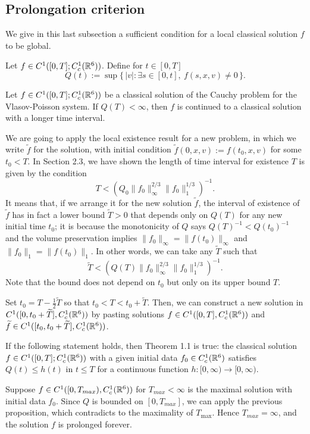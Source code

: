 \documentclass[12pt]{article}
\begin{document}
\subsection{Prolongation criterion}
We give in this last subsection a sufficient condition for a local classical solution $f$ to be global.
\begin{defn}
Let $f\in C^1([0,T];C_c^1(\mathbb{R}^6))$.
Define for $t\in[0,T]$
\[Q(t):=\sup\{\,|v|:\exists s\in[0,t],\ f(s,x,v)\ne0\,\}.\]
\end{defn}
\begin{prop}
Let $f\in C^1([0,T];C_c^1(\mathbb{R}^6))$ be a classical solution of the Cauchy problem for the Vlasov-Poisson system.
If $Q(T)<\infty$, then $f$ is continued to a classical solution with a longer time interval.
\end{prop}
\begin{pf}
We are going to apply the local existence result for a new problem, in which we write $\tilde f$ for the solution, with initial condition $\tilde f(0,x,v):=f(t_0,x,v)$ for some $t_0<T$.
In Section 2.3, we have shown the length of time interval for existence $T$ is given by the condition
\[T<(Q_0\|f_0\|_\infty^{2/3}\|f_0\|_1^{1/3})^{-1}.\]
It means that, if we arrange it for the new solution $\tilde f$, the interval of existence of $\tilde f$ has in fact a lower bound $\tilde T>0$ that depends only on $Q(T)$ for any new initial time $t_0$; it is because the monotonicity of $Q$ says $Q(T)^{-1}<Q(t_0)^{-1}$ and the volume preservation implies $\|f_0\|_\infty=\|f(t_0)\|_\infty$ and $\|f_0\|_1=\|f(t_0)\|_1$.
In other words, we can take any $\tilde T$ such that
\[\tilde T<(Q(T)\|f_0\|_\infty^{2/3}\|f_0\|_1^{1/3})^{-1}.\]
Note that the bound does not depend on $t_0$ but only on its upper bound $T$.

Set $t_0=T-\frac12\tilde T$ so that $t_0<T<t_0+\tilde T$.
Then, we can construct a new solution in $C^1([0,t_0+\widetilde T],C_c^1(\mathbb{R}^6))$ by pasting solutions $f\in C^1([0,T],C_c^1(\mathbb{R}^6))$ and $\widetilde f\in C^1([t_0,t_0+\widetilde T],C_c^1(\mathbb{R}^6))$.
\end{pf}

\begin{cor}
If the following statement holds, then Theorem 1.1 is true: the classical solution $f\in C^1([0,T];C_c^1(\mathbb{R}^6))$ with a given initial data $f_0\in C_c^1(\mathbb{R}^6)$ satisfies $Q(t)\le h(t)$ in $t\le T$ for a continuous function $h:[0,\infty)\to[0,\infty)$.
\end{cor}
\begin{pf}
Suppose $f\in C^1([0,T_{max}),C_c^1(\mathbb{R}^6))$ for $T_{max}<\infty$ is the maximal solution with initial data $f_0$.
Since $Q$ is bounded on $[0,T_{max}]$, we can apply the previous proposition, which contradicts to the maximality of $T_{\max}$.
Hence $T_{max}=\infty$, and the solution $f$ is prolonged forever.
\end{pf}
\end{document}
